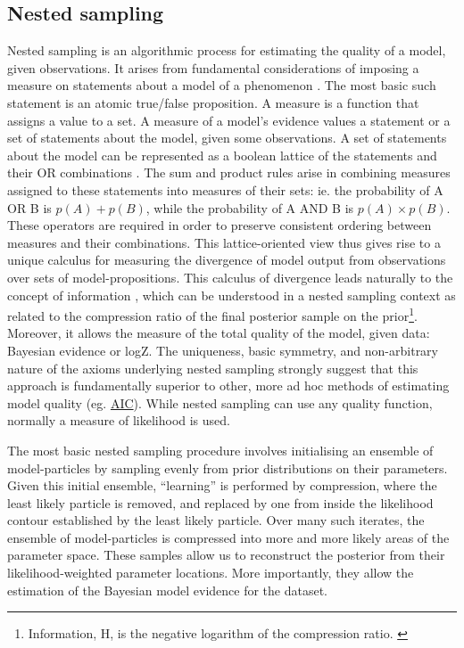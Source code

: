 \documentclass{ut-thesis}
\begin{document}
\begin{NoHyper}
\subsection{Nested sampling}
\label{ssec:nested}
Nested sampling is an algorithmic process for estimating the quality of a model, given observations. It arises from fundamental considerations of imposing a measure on statements about a model of a phenomenon \cite{Skilling2012}. The most basic such statement is an atomic true/false proposition. A measure is a function that assigns a value to a set. A measure of a model's evidence values a statement or a set of statements about the model, given some observations. A set of statements about the model can be represented as a boolean lattice of the statements and their OR combinations \cite{Knuth2012}. The sum and product rules arise in combining measures assigned to these statements into measures of their sets: ie. the probability of A OR B is $p(A) + p(B)$, while the probability of A AND B is $p(A) \times p(B)$. These operators are required in order to preserve consistent ordering between measures and their combinations. This lattice-oriented view thus gives rise to a unique calculus for measuring the divergence of model output from observations over sets of model-propositions\cite{Knuth2012}. This calculus of divergence leads naturally to the concept of information \cite{Skilling2012}, which can be understood in a nested sampling context as related to the compression ratio of the final posterior sample on the prior\footnote{Information, H, is the negative logarithm of the compression ratio. \cite{Skilling2006}}. Moreover, it allows the measure of the total quality of the model, given data: Bayesian evidence or logZ. The uniqueness, basic symmetry, and non-arbitrary nature of the axioms underlying nested sampling strongly suggest that this approach is fundamentally superior to other, more ad hoc methods of estimating model quality (eg. \hyperref[ssec:AIC]{AIC}). While nested sampling can use any quality function, normally a measure of likelihood is used.

The most basic nested sampling procedure involves initialising an ensemble of model-particles by sampling evenly from prior distributions on their parameters. Given this initial ensemble, ``learning'' is performed by compression, where the least likely particle is removed, and replaced by one from inside the likelihood contour established by the least likely particle. Over many such iterates, the ensemble of model-particles is compressed into more and more likely areas of the parameter space. These samples allow us to reconstruct the posterior from their likelihood-weighted parameter locations. More importantly, they allow the estimation of the Bayesian model evidence for the dataset.


\end{NoHyper}
\end{document}
